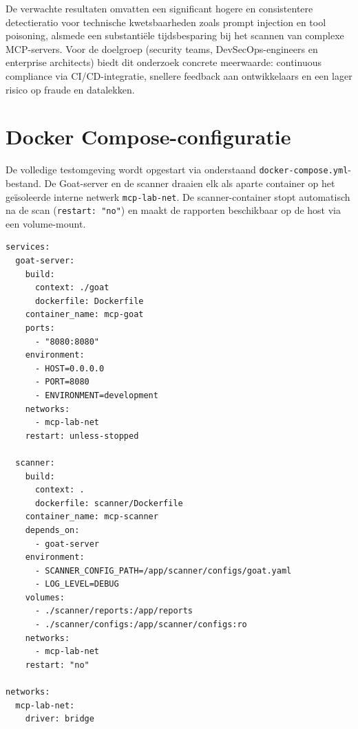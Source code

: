\documentclass[dutch,dit,thesis]{hogentreport}
\begin{document}
De verwachte resultaten omvatten een significant hogere en consistentere detectieratio voor technische kwetsbaarheden zoals prompt injection en tool poisoning, alsmede een substantiële tijdsbesparing bij het scannen van complexe MCP-servers. Voor de doelgroep (security teams, DevSecOps-engineers en enterprise architects) biedt dit onderzoek concrete meerwaarde: continuous compliance via CI/CD-integratie, snellere feedback aan ontwikkelaars en een lager risico op fraude en datalekken.





\chapter{Docker Compose-configuratie}
\label{app:compose}

De volledige testomgeving wordt opgestart via onderstaand \texttt{docker-compose.yml}-bestand. De Goat-server en de scanner draaien elk als aparte container op het geïsoleerde interne netwerk \texttt{mcp-lab-net}. De scanner-container stopt automatisch na de scan (\texttt{restart: "no"}) en maakt de rapporten beschikbaar op de host via een volume-mount.

\begin{listing}[htbp]
\begin{verbatim}
services:
  goat-server:
    build:
      context: ./goat
      dockerfile: Dockerfile
    container_name: mcp-goat
    ports:
      - "8080:8080"
    environment:
      - HOST=0.0.0.0
      - PORT=8080
      - ENVIRONMENT=development
    networks:
      - mcp-lab-net
    restart: unless-stopped

  scanner:
    build:
      context: .
      dockerfile: scanner/Dockerfile
    container_name: mcp-scanner
    depends_on:
      - goat-server
    environment:
      - SCANNER_CONFIG_PATH=/app/scanner/configs/goat.yaml
      - LOG_LEVEL=DEBUG
    volumes:
      - ./scanner/reports:/app/reports
      - ./scanner/configs:/app/scanner/configs:ro
    networks:
      - mcp-lab-net
    restart: "no"

networks:
  mcp-lab-net:
    driver: bridge
\end{verbatim}
\caption{\texttt{docker-compose.yml} van de evaluatieomgeving (commit \texttt{1247c41}).}
\label{lst:compose}
\end{listing}


\backmatter{}

\setlength\bibitemsep{2pt} %
\printbibliography[heading=bibintoc]
\end{document}
